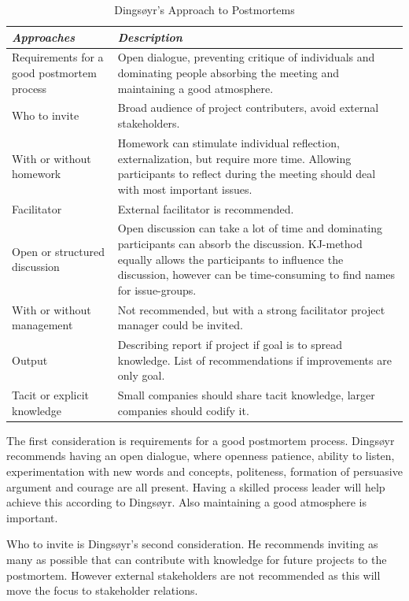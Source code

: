 \begin{table}[h]
	\begin{center}
		\caption{Dingsøyr's Approach to Postmortems}
		\label{table:postmortem-approach}
		\begin{tabular}{p{} p{}}
			\hline
			\textit{Approaches} & \textit{Description} \\
			\hline
			Requirements for a good postmortem process & Open dialogue, preventing critique of individuals and dominating people absorbing the meeting and maintaining a good atmosphere. \\
			Who to invite & Broad audience of project contributers, avoid external stakeholders. \\
			With or without homework & Homework can stimulate individual reflection, externalization, but require more time. Allowing participants to reflect during the meeting should deal with most important issues. \\
			Facilitator & External facilitator is recommended. \\
			Open or structured discussion & Open discussion can take a lot of time and dominating participants can absorb the discussion. KJ-method equally allows the participants to influence the discussion, however can be time-consuming to find names for issue-groups. \\
				With or without management & Not recommended, but with a strong facilitator project manager could be invited. \\
			Output & Describing report if project if goal is to spread knowledge. List of recommendations if improvements are only goal. \\
			Tacit or explicit knowledge & Small companies should share tacit knowledge, larger companies should codify it. \\
			\hline
		\end{tabular}
	\end{center}
\end{table}

The first consideration is requirements for a good postmortem process. Dingsøyr recommends having an open dialogue, where openness patience, ability to listen, experimentation with new words and concepts, politeness, formation of persuasive argument and courage are all present. Having a skilled process leader will help achieve this according to Dingsøyr. Also maintaining a good atmosphere is important. 

Who to invite is Dingsøyr's second consideration. He recommends inviting as many as possible that can contribute with knowledge for future projects to the postmortem. However external stakeholders are not recommended as this will move the focus to stakeholder relations. 

